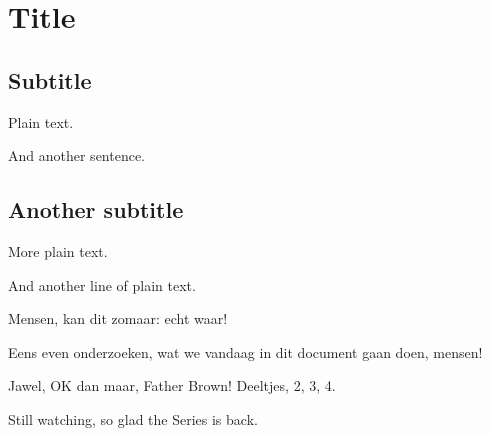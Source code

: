 \documentclass{book}
\begin{document}
\section{Title}


\subsection{Subtitle}

Plain text.

And another sentence.

\subsection{Another subtitle}

More plain text.

And another line of plain text.

Mensen, kan dit zomaar: echt waar!

Eens even onderzoeken, wat we vandaag in dit document gaan doen, mensen!

Jawel, OK dan maar, Father Brown! Deeltjes, 2, 3, 4.

Still watching, so glad the Series is back.
\end{document}
